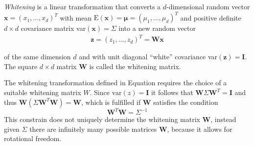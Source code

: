\textit{Whitening} is a linear transformation that converts a $d$-dimensional
random vector $\mathbf{x} = (x_1,...,x_d)^T$ with mean
$\text{E}(\mathbf{x}) = \mathbf{\mu} = (\mu_1,...,\mu_d)^T$ and
positive definite $d \times d$ covariance matrix
var$(\mathbf{x}) = \Sigma$ into a new random vector
\begin{align}
  \label{whitening}
 \mathbf{z} = (z_1,...,z_d)^T = \mathbf{W}\mathbf{x}
\end{align}

of the same dimension $d$ and with unit diagonal ``white'' covariance
var$(\mathbf{z}) = \mathbf{I}$. The square $d \times d$
matrix $\mathbf{W}$ is called the whitening matrix.

The whitening transformation defined in Equation  requires
the choice of a suitable whitening matrix $W$.
Since $\text{var}(z) = \mathbf{I}$ it follows that
$\mathbf{W}\Sigma \mathbf{W}^T = \mathbf{I}$ and thus
$\mathbf{W}(\Sigma \mathbf{W}^T\mathbf{W}) = \mathbf{W}$, which
is fulfilled if $\mathbf{W}$ satisfies the condition
$$ \mathbf{W}^T \mathbf{W} = \Sigma^{-1} $$
This constrain does not uniquely determine the whitening
matrix $\mathbf{W}$, instead given $\Sigma$ there are infinitely many
possible matrices $\mathbf{W}$, because it allows for rotational freedom.







%